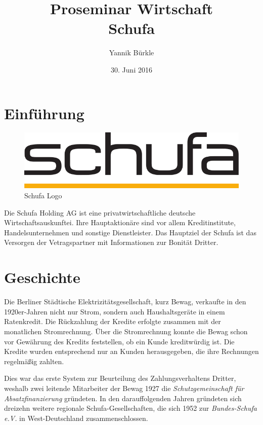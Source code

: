 \documentclass[12pt]{article}
\begin{document}
\begin{titlepage}
\title{Proseminar Wirtschaft\\Schufa}
\author{Yannik Bürkle}
\date{30. Juni 2016}
\end{titlepage}
\maketitle

\newpage

\tableofcontents

\newpage






\section{Einführung}
\begin{figure}[htbp]
    \centering
    \includegraphics[width=0.8\linewidth]{Schufa_Logo}
    \caption{Schufa Logo}
\end{figure}

Die Schufa Holding AG ist eine privatwirtschaftliche deutsche Wirtschaftsauskunftei. Ihre Hauptaktionäre 
sind vor allem Kreditinstitute, Handelsunternehmen und sonstige Dienstleister.
Das Hauptziel der Schufa ist das Versorgen der Vetragspartner mit Informationen zur Bonität Dritter.






\section{Geschichte}
Die Berliner Städtische Elektrizitätsgesellschaft, kurz Bewag, verkaufte in den 1920er-Jahren nicht nur Strom, sondern auch Haushaltsgeräte in einem Ratenkredit.
Die Rückzahlung der Kredite erfolgte zusammen mit der monatlichen Stromrechnung. Über die Stromrechnung konnte die Bewag schon vor Gewährung des Kredits feststellen, 
ob ein Kunde kreditwürdig ist. Die Kredite wurden entsprechend nur an Kunden herausgegeben, die ihre Rechnungen regelmäßig zahlten.

Dies war das erste System zur Beurteilung des Zahlungsverhaltens Dritter, weshalb zwei leitende Mitarbeiter der Bewag 1927 die \textit{Schutzgemeinschaft für Absatzfinanzierung} gründeten.
In den darauffolgenden Jahren gründeten sich dreizehn weitere regionale Schufa-Gesellschaften, die sich 1952 zur \textit{Bundes-Schufa e.V.} in West-Deutschland zusammenschlossen.
\end{document}
